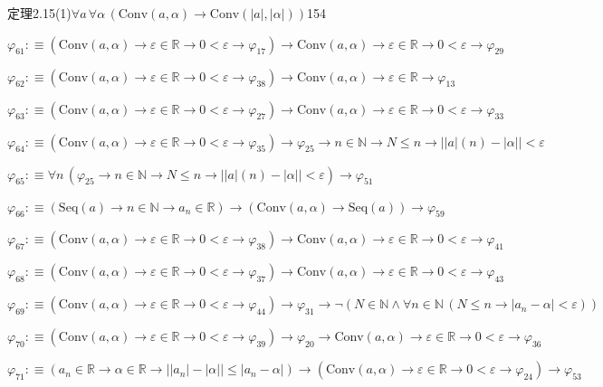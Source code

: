 \begin{fullproof}{定理2.15(1)}{$\forall a\,\forall \alpha\,(\mathrm{Conv}(a,\alpha) \to \mathrm{Conv}(\lvert a \rvert,\lvert \alpha \rvert))$}{154}
\begin{abbrevlist}
\item $\varphi_{61} :\equiv (\mathrm{Conv}(a,\alpha) \to \varepsilon \in \mathbb{R} \to 0 < \varepsilon \to \varphi_{17}) \to \mathrm{Conv}(a,\alpha) \to \varepsilon \in \mathbb{R} \to 0 < \varepsilon \to \varphi_{29}$
\item $\varphi_{62} :\equiv (\mathrm{Conv}(a,\alpha) \to \varepsilon \in \mathbb{R} \to 0 < \varepsilon \to \varphi_{38}) \to \mathrm{Conv}(a,\alpha) \to \varepsilon \in \mathbb{R} \to \varphi_{13}$
\item $\varphi_{63} :\equiv (\mathrm{Conv}(a,\alpha) \to \varepsilon \in \mathbb{R} \to 0 < \varepsilon \to \varphi_{27}) \to \mathrm{Conv}(a,\alpha) \to \varepsilon \in \mathbb{R} \to 0 < \varepsilon \to \varphi_{33}$
\item $\varphi_{64} :\equiv (\mathrm{Conv}(a,\alpha) \to \varepsilon \in \mathbb{R} \to 0 < \varepsilon \to \varphi_{35}) \to \varphi_{25} \to n \in \mathbb{N} \to N \leq n \to \lvert \lvert a \rvert(n) - \lvert \alpha \rvert \rvert < \varepsilon$
\item $\varphi_{65} :\equiv \forall n\,(\varphi_{25} \to n \in \mathbb{N} \to N \leq n \to \lvert \lvert a \rvert(n) - \lvert \alpha \rvert \rvert < \varepsilon) \to \varphi_{51}$
\item $\varphi_{66} :\equiv (\mathrm{Seq}(a) \to n \in \mathbb{N} \to a_{n} \in \mathbb{R}) \to (\mathrm{Conv}(a,\alpha) \to \mathrm{Seq}(a)) \to \varphi_{59}$
\item $\varphi_{67} :\equiv (\mathrm{Conv}(a,\alpha) \to \varepsilon \in \mathbb{R} \to 0 < \varepsilon \to \varphi_{38}) \to \mathrm{Conv}(a,\alpha) \to \varepsilon \in \mathbb{R} \to 0 < \varepsilon \to \varphi_{41}$
\item $\varphi_{68} :\equiv (\mathrm{Conv}(a,\alpha) \to \varepsilon \in \mathbb{R} \to 0 < \varepsilon \to \varphi_{37}) \to \mathrm{Conv}(a,\alpha) \to \varepsilon \in \mathbb{R} \to 0 < \varepsilon \to \varphi_{43}$
\item $\varphi_{69} :\equiv (\mathrm{Conv}(a,\alpha) \to \varepsilon \in \mathbb{R} \to 0 < \varepsilon \to \varphi_{44}) \to \varphi_{31} \to \neg (N \in \mathbb{N} \land \forall n \in \mathbb{N}\,(N \leq n \to \lvert a_{n} - \alpha \rvert < \varepsilon))$
\item $\varphi_{70} :\equiv (\mathrm{Conv}(a,\alpha) \to \varepsilon \in \mathbb{R} \to 0 < \varepsilon \to \varphi_{39}) \to \varphi_{20} \to \mathrm{Conv}(a,\alpha) \to \varepsilon \in \mathbb{R} \to 0 < \varepsilon \to \varphi_{36}$
\item $\varphi_{71} :\equiv (a_{n} \in \mathbb{R} \to \alpha \in \mathbb{R} \to \lvert \lvert a_{n} \rvert - \lvert \alpha \rvert \rvert \leq \lvert a_{n} - \alpha \rvert) \to (\mathrm{Conv}(a,\alpha) \to \varepsilon \in \mathbb{R} \to 0 < \varepsilon \to \varphi_{24}) \to \varphi_{53}$

\end{abbrevlist}
\end{fullproof}
